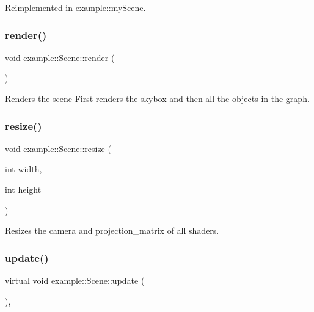 Reimplemented in \mbox{\hyperlink{classexample_1_1my_scene_a61a6d862d5c0b1ef8e31daa089699bd4}{example\+::my\+Scene}}.

\mbox{\label{classexample_1_1_scene_a6e8672b9fab7eaa38bc039467dc0b66a}} 
\subsubsection{\texorpdfstring{render()}{render()}}
{\footnotesize\ttfamily void example\+::\+Scene\+::render (\begin{DoxyParamCaption}{ }\end{DoxyParamCaption})\hspace{0.3cm}{\ttfamily [inline]}}



Renders the scene First renders the skybox and then all the objects in the graph. 

\mbox{\label{classexample_1_1_scene_a96fdbfc5f6fde59dd1372af8e0ad6bfb}} 
\subsubsection{\texorpdfstring{resize()}{resize()}}
{\footnotesize\ttfamily void example\+::\+Scene\+::resize (\begin{DoxyParamCaption}\item[{int}]{width,  }\item[{int}]{height }\end{DoxyParamCaption})\hspace{0.3cm}{\ttfamily [inline]}}



Resizes the camera and projection\+\_\+matrix of all shaders. 

\mbox{\label{classexample_1_1_scene_af0a25c01b0759a02ab7a00364a853b6f}} 
\subsubsection{\texorpdfstring{update()}{update()}}
{\footnotesize\ttfamily virtual void example\+::\+Scene\+::update (\begin{DoxyParamCaption}{ }\end{DoxyParamCaption})\hspace{0.3cm}{\ttfamily [inline]}, {\ttfamily [virtual]}}



